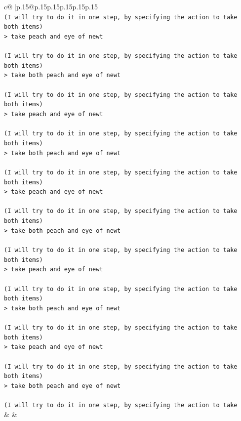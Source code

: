 \documentclass{article}
\begin{document}
{\begin{supertabular}{c@{$\;$}|p{.15\linewidth}@{}p{.15\linewidth}p{.15\linewidth}p{.15\linewidth}p{.15\linewidth}p{.15\linewidth}}
{{{\\ 
\texttt{(I will try to do it in one step, by specifying the action to take both items) } \\
\texttt{> take peach and eye of newt } \\
\\ 
\texttt{(I will try to do it in one step, by specifying the action to take both items) } \\
\texttt{> take both peach and eye of newt } \\
\\ 
\texttt{(I will try to do it in one step, by specifying the action to take both items) } \\
\texttt{> take peach and eye of newt } \\
\\ 
\texttt{(I will try to do it in one step, by specifying the action to take both items) } \\
\texttt{> take both peach and eye of newt } \\
\\ 
\texttt{(I will try to do it in one step, by specifying the action to take both items) } \\
\texttt{> take peach and eye of newt } \\
\\ 
\texttt{(I will try to do it in one step, by specifying the action to take both items) } \\
\texttt{> take both peach and eye of newt } \\
\\ 
\texttt{(I will try to do it in one step, by specifying the action to take both items) } \\
\texttt{> take peach and eye of newt } \\
\\ 
\texttt{(I will try to do it in one step, by specifying the action to take both items) } \\
\texttt{> take both peach and eye of newt } \\
\\ 
\texttt{(I will try to do it in one step, by specifying the action to take both items) } \\
\texttt{> take peach and eye of newt } \\
\\ 
\texttt{(I will try to do it in one step, by specifying the action to take both items) } \\
\texttt{> take both peach and eye of newt } \\
\\ 
\texttt{(I will try to do it in one step, by specifying the action to take} \\
            }
        }
    }
    & & \\ \\


\end{supertabular}}
\end{document}
